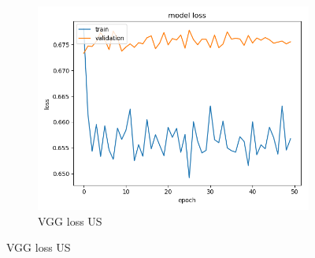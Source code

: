 \begin{figure}[h]
\begin{subfigure}[b]{.3\linewidth}
\includegraphics[width=\linewidth]{Figs/vgg_us_loss.jpg}
\caption{VGG loss US}
\end{subfigure}


\end{figure}

